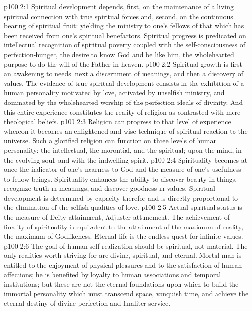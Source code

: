 \vs p100 2:1 Spiritual development depends, first, on the maintenance of a living spiritual connection with true spiritual forces and, second, on the continuous bearing of spiritual fruit: yielding the ministry to one’s fellows of that which has been received from one’s spiritual benefactors. Spiritual progress is predicated on intellectual recognition of spiritual poverty coupled with the self\hyp{}consciousness of perfection\hyp{}hunger, the desire to know God and be like him, the wholehearted purpose to do the will of the Father in heaven.
\vs p100 2:2 Spiritual growth is first an awakening to needs, next a discernment of meanings, and then a discovery of values. The evidence of true spiritual development consists in the exhibition of a human personality motivated by love, activated by unselfish ministry, and dominated by the wholehearted worship of the perfection ideals of divinity. And this entire experience constitutes the reality of religion as contrasted with mere theological beliefs.
\vs p100 2:3 Religion can progress to that level of experience whereon it becomes an enlightened and wise technique of spiritual reaction to the universe. Such a glorified religion can function on three levels of human personality: the intellectual, the morontial, and the spiritual; upon the mind, in the evolving soul, and with the indwelling spirit.
\vs p100 2:4 \pc Spirituality becomes at once the indicator of one’s nearness to God and the measure of one’s usefulness to fellow beings. Spirituality enhances the ability to discover beauty in things, recognize truth in meanings, and discover goodness in values. Spiritual development is determined by capacity therefor and is directly proportional to the elimination of the selfish qualities of love.
\vs p100 2:5 Actual spiritual status is the measure of Deity attainment, Adjuster attunement. The achievement of finality of spirituality is equivalent to the attainment of the maximum of reality, the maximum of Godlikeness. Eternal life is the endless quest for infinite values.
\vs p100 2:6 \pc The goal of human self\hyp{}realization should be spiritual, not material. The only realities worth striving for are divine, spiritual, and eternal. Mortal man is entitled to the enjoyment of physical pleasures and to the satisfaction of human affections; he is benefited by loyalty to human associations and temporal institutions; but these are not the eternal foundations upon which to build the immortal personality which must transcend space, vanquish time, and achieve the eternal destiny of divine perfection and finaliter service.
